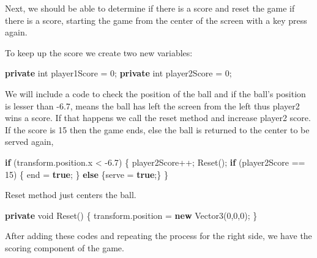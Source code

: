 \documentclass[
]{book}
\newenvironment{Shaded}{\begin{snugshade}}{\end{snugshade}}
\newcommand{\DataTypeTok}[1]{\textcolor[rgb]{0.13,0.29,0.53}{#1}}
\newcommand{\DecValTok}[1]{\textcolor[rgb]{0.00,0.00,0.81}{#1}}
\newcommand{\FloatTok}[1]{\textcolor[rgb]{0.00,0.00,0.81}{#1}}
\newcommand{\FunctionTok}[1]{\textcolor[rgb]{0.00,0.00,0.00}{#1}}
\newcommand{\KeywordTok}[1]{\textcolor[rgb]{0.13,0.29,0.53}{\textbf{#1}}}
\newcommand{\NormalTok}[1]{#1}
\begin{document}
Next, we should be able to determine if there is a score and reset the game if there is a score, starting the game from the center of the screen with a key press again.

To keep up the score we create two new variables:

\begin{Shaded}
\begin{Highlighting}[]
\KeywordTok{private} \DataTypeTok{int}\NormalTok{ player1Score = }\DecValTok{0}\NormalTok{;}
\KeywordTok{private} \DataTypeTok{int}\NormalTok{ player2Score = }\DecValTok{0}\NormalTok{;}
\end{Highlighting}
\end{Shaded}

We will include a code to check the position of the ball and if the ball's position is lesser than -6.7, means the ball has left the screen from the left thus player2 wins a score. If that happens we call the reset method and increase player2 score. If the score is 15 then the game ends, else the ball is returned to the center to be served again,

\begin{Shaded}
\begin{Highlighting}[]
\KeywordTok{if}\NormalTok{ (transform.}\FunctionTok{position}\NormalTok{.}\FunctionTok{x}\NormalTok{ < }\FloatTok{-6.7}\NormalTok{)}
\NormalTok{\{}
\NormalTok{  player2Score++;}
  \FunctionTok{Reset}\NormalTok{();}
  \KeywordTok{if}\NormalTok{ (player2Score == }\DecValTok{15}\NormalTok{)}
\NormalTok{  \{}
\NormalTok{    end = }\KeywordTok{true}\NormalTok{;}
\NormalTok{  \} }\KeywordTok{else}\NormalTok{ \{serve = }\KeywordTok{true}\NormalTok{;\}}
\NormalTok{\}}
\end{Highlighting}
\end{Shaded}

Reset method just centers the ball.

\begin{Shaded}
\begin{Highlighting}[]
\KeywordTok{private} \DataTypeTok{void} \FunctionTok{Reset}\NormalTok{()}
\NormalTok{\{}
\NormalTok{  transform.}\FunctionTok{position}\NormalTok{ = }\KeywordTok{new} \FunctionTok{Vector3}\NormalTok{(}\DecValTok{0}\NormalTok{,}\DecValTok{0}\NormalTok{,}\DecValTok{0}\NormalTok{);}
\NormalTok{\}}
\end{Highlighting}
\end{Shaded}

After adding these codes and repeating the process for the right side, we have the scoring component of the game.
\end{document}
